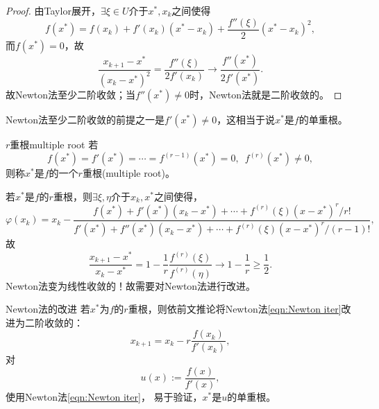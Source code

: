 \begin{proof}
    由Taylor展开，$\exists\xi \in U$介于$x^*,x_k$之间使得
    \[
        f(x^*) = f(x_k) + f'(x_k)(x^* - x_k) + \frac{f''(\xi)}2(x^* - x_k)^2,
    \]
    而$f(x^*) = 0$，故
    \begin{equation}\label{eq:na-newton-quadratic-error}
        \frac{x_{k+1} - x^*}{(x_k - x^*)^2} = \frac{f''(\xi)}{2f'(x_k)} \to \frac{f''(x^*)}{2f'(x^*)}.
    \end{equation}
    故Newton法至少二阶收敛；当$f''(x^*) \neq 0$时，Newton法就是二阶收敛的。
\end{proof}

\begin{remark}
    Newton法至少二阶收敛的前提之一是$f'(x^*) \neq 0$，这相当于说$x^*$是$f$的单重根。
\end{remark}

\begin{definition}
    {$r$重根}{multiple root}
    若
    \begin{equation}\label{eq:na-root-multiplicity}
        f(x^*) = f'(x^*) = \cdots = f^{(r-1)}(x^*) = 0,\enspace f^{(r)}(x^*) \neq 0,
    \end{equation}
    则称$x^*$是$f$的一个$r$重根(multiple root)。
\end{definition}

\begin{corollary}
    若$x^*$是$f$的$r$重根，则$\exists\xi,\eta$介于$x_k,x^*$之间使得，
    \[
        \varphi(x_k) = x_k - \frac{f(x^*) + f'(x^*)(x_k - x^*) + \cdots + f^{(r)}(\xi)(x - x^*)^r/r!}{f'(x^*) + f''(x^*)(x_k - x^*) + \cdots + f^{(r)}(\xi)(x - x^*)^r/(r - 1)!},
    \]
    故
    \[
        \frac{x_{k+1} - x^*}{x_k - x^*} = 1 - \frac1r\frac{f^{(r)}(\xi)}{f^{(r)}(\eta)} \to 1 - \frac1r \geq \frac12.
    \]
    Newton法变为线性收敛的！故需要对Newton法进行改进。
\end{corollary}

\begin{theorem}
    {Newton法的改进}{}
    若$x^*$为$f$的$r$重根，则依前文推论将Newton法\eqref{eqn:Newton iter}改进为二阶收敛的：
    \begin{equation}
        \label{eqn:Newton iter r-multiroot}
        x_{k+1} = x_k - r\frac{f(x_k)}{f'(x_k)},
    \end{equation}
    \tcblower
    对
    \begin{equation}
        u(x) := \frac{f(x)}{f'(x)},
    \end{equation}
    使用Newton法\eqref{eqn:Newton iter}，
    易于验证，$x^*$是$u$的单重根。
\end{theorem}

